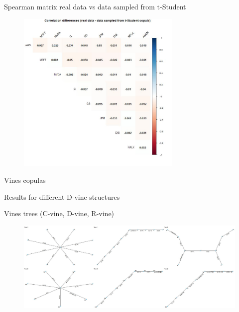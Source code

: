 \documentclass{beamer}
\begin{document}
\begin{frame}{Spearman matrix real data vs data sampled from t-Student}
\centering
\begin{figure}[!h]
  \centering
    \includegraphics[width=0.7\textwidth]{figures/correlation/spearman_real_data_vs_t_copula.jpeg}
\end{figure}
    
\end{frame}

\begin{frame}{Vines copulas}

\centering
\begin{table}
   
\end{table}

\end{frame}

\begin{frame}{Results for different D-vine structures}

\centering
\begin{table}
   
\end{table}

\end{frame}

\begin{frame}{Vines trees (C-vine, D-vine, R-vine)}

\centering
\begin{figure}[!h]
  \centering
    \includegraphics[width=\textwidth]{figures/vine_trees/vine_trees.jpg}
\end{figure}
\end{frame}
\end{document}
